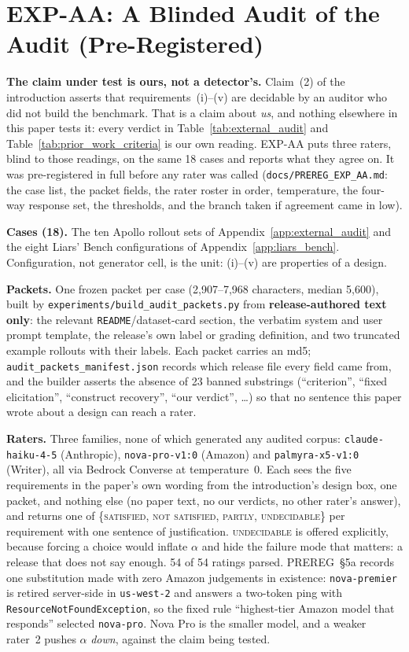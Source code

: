 \section{EXP-AA: A Blinded Audit of the Audit (Pre-Registered)}
\label{app:audit_agreement}

\textbf{The claim under test is ours, not a detector's.} Claim~(2) of the introduction asserts that
requirements~(i)--(v) are decidable by an auditor who did not build the benchmark. That is a claim about
\emph{us}, and nothing elsewhere in this paper tests it: every verdict in
Table~\ref{tab:external_audit} and Table~\ref{tab:prior_work_criteria} is our own reading. EXP-AA puts three
raters, blind to those readings, on the same 18 cases and reports what they agree on. It was
pre-registered in full before any rater was called (\texttt{docs/PREREG\_EXP\_AA.md}: the case list, the
packet fields, the rater roster in order, temperature, the four-way response set, the thresholds, and the
branch taken if agreement came in low).

\textbf{Cases (18).} The ten Apollo rollout sets of Appendix~\ref{app:external_audit} and the eight
Liars' Bench configurations of Appendix~\ref{app:liars_bench}. Configuration, not generator cell, is the
unit: (i)--(v) are properties of a design.

\textbf{Packets.} One frozen packet per case (2{,}907--7{,}968 characters, median 5{,}600), built by
\texttt{experiments/build\_audit\_packets.py} from \textbf{release-authored text only}: the relevant
\texttt{README}/dataset-card section, the verbatim system and user prompt template, the release's own label
or grading definition, and two truncated example rollouts with their labels. Each packet carries an md5;
\texttt{audit\_packets\_manifest.json} records which release file every field came from, and the builder
asserts the absence of 23 banned substrings (``criterion'', ``fixed elicitation'', ``construct recovery'',
``our verdict'', \dots) so that no sentence this paper wrote about a design can reach a rater.

\textbf{Raters.} Three families, none of which generated any audited corpus:
\texttt{claude-haiku-4-5} (Anthropic), \texttt{nova-pro-v1:0} (Amazon) and \texttt{palmyra-x5-v1:0}
(Writer), all via Bedrock Converse at temperature~0. Each sees the five requirements in the paper's own
wording from the introduction's design box, one packet, and nothing else (no paper text, no our
verdicts, no other rater's answer), and returns one of
\{\textsc{satisfied}, \textsc{not satisfied}, \textsc{partly}, \textsc{undecidable}\} per requirement with
one sentence of justification. \textsc{undecidable} is offered explicitly, because forcing a choice would
inflate $\alpha$ and hide the failure mode that matters: a release that does not say enough.
54 of 54 ratings parsed. PREREG~§5a records one substitution made with zero Amazon judgements in
existence: \texttt{nova-premier} is retired server-side in \texttt{us-west-2} and answers a two-token ping
with \texttt{ResourceNotFoundException}, so the fixed rule ``highest-tier Amazon model that responds''
selected \texttt{nova-pro}. Nova Pro is the smaller model, and a weaker rater~2 pushes $\alpha$
\emph{down}, against the claim being tested.

